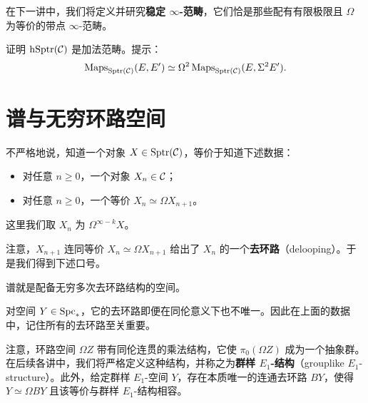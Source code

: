\begin{remark}\label{L14-2.19}
在下一讲中，我们将定义并研究\textbf{稳定 $\infty$-范畴}，它们恰是那些配有有限极限且 $\Omega$ 为等价的带点 $\infty$-范畴。
\end{remark}

\begin{exercise}\label{L14-2.20}
证明 $\mathrm{h}\mathrm{Sptr}(\mathcal{C})$ 是加法范畴。提示：
\[
\operatorname{Maps}_{\mathrm{Sptr}(\mathcal{C})}(E,E')\simeq\Omega^{2}\operatorname{Maps}_{\mathrm{Sptr}(\mathcal{C})}(E,\Sigma^{2}E').
\]
\end{exercise}

\section{谱与无穷环路空间}

\nitem\label{L14-3.1} 不严格地说，知道一个对象 $X\in\mathrm{Sptr}(\mathcal{C})$，等价于知道下述数据：
\begin{itemize}[leftmargin=2.2em,itemsep=0.1em]
\item 对任意 $n\ge 0$，一个对象 $X_{n}\in\mathcal{C}$；
\item 对任意 $n\ge 0$，一个等价 $X_{n}\simeq\Omega X_{n+1}$。
\end{itemize}
这里我们取 $X_{n}$ 为 $\Omega^{\infty-k}X$。


注意，$X_{n+1}$ 连同等价 $X_{n}\simeq\Omega X_{n+1}$ 给出了 $X_{n}$ 的一个\textbf{去环路}（delooping）。于是我们得到下述口号。

\begin{slogan}\label{L14-3.2}\centering\par
谱就是配备无穷多次去环路结构的空间。
\end{slogan}

\begin{warning}\label{L14-3.3}
对空间 $Y\in\operatorname{Spc}_{\ast}$，它的去环路即便在同伦意义下也不唯一。因此在上面的数据中，记住所有的去环路至关重要。
\end{warning}

\nitem\label{L14-3.4} 注意，环路空间 $\Omega Z$ 带有同伦连贯的乘法结构，它使 $\pi_{0}(\Omega Z)$ 成为一个抽象群。在后续各讲中，我们将严格定义这种结构，并称之为\textbf{群样 $E_{1}$-结构}（grouplike $E_1$-structure）。此外，给定群样 $E_{1}$-空间 $Y$，存在本质唯一的连通去环路 $BY$，使得 $Y\simeq\Omega BY$ 且该等价与群样 $E_{1}$-结构相容。

